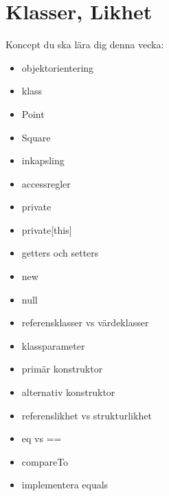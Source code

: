 \chapter{Klasser, Likhet}\label{chapter:W06}
Koncept du ska lära dig denna vecka:
\begin{multicols}{2}\begin{itemize}[nosep,label={$\square$},leftmargin=*]
\item objektorientering
\item klass
\item Point
\item Square
\item inkapsling
\item accessregler
\item private
\item private[this]
\item getters och setters
\item new
\item null
\item referensklasser vs värdeklasser
\item klassparameter
\item primär konstruktor
\item alternativ konstruktor
\item referenslikhet vs strukturlikhet
\item eq vs ==
\item compareTo
\item implementera equals\end{itemize}\end{multicols}
